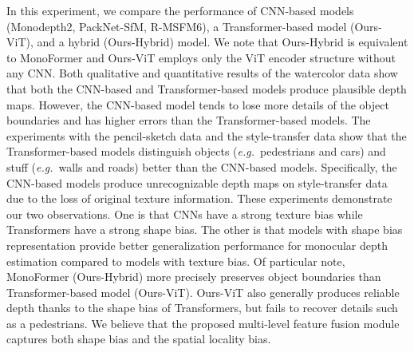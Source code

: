 \documentclass[letterpaper]{article} \usepackage{aaai23}  \usepackage{times}  \usepackage{helvet}  \usepackage{courier}  \usepackage[hyphens]{url}  \usepackage{graphicx} \urlstyle{rm} \def\UrlFont{\rm}  \usepackage{natbib}  \usepackage{caption} \frenchspacing  \setlength{\pdfpagewidth}{8.5in} \setlength{\pdfpageheight}{11in} \usepackage{algorithm}
\newcommand{\eg}{\textit{e.g.}}
\begin{document}
In this experiment, we compare the performance of CNN-based models (Monodepth2, PackNet-SfM, R-MSFM6), a Transformer-based model (Ours-ViT), and a hybrid (Ours-Hybrid) model.
We note that Ours-Hybrid is equivalent to MonoFormer and Ours-ViT employs only the ViT  \cite{dosovitskiy2020image} encoder structure without any CNN.
Both qualitative and quantitative results of the watercolor data show that both the CNN-based and Transformer-based models produce plausible depth maps. However, the CNN-based model tends to lose more details of the object boundaries and has higher errors than the Transformer-based models.
The experiments with the pencil-sketch data and the style-transfer data show that the Transformer-based models distinguish objects (\eg~pedestrians and cars) and stuff (\eg~walls and roads) better than the CNN-based models.
Specifically, the CNN-based models produce unrecognizable depth maps on style-transfer data due to the loss of original texture information.
These experiments demonstrate our two observations. 
One is that CNNs have a strong texture bias while Transformers have a strong shape bias.
The other is that models with shape bias representation provide better generalization performance for monocular depth estimation compared to models with texture bias. 
Of particular note, MonoFormer (Ours-Hybrid) more precisely preserves object boundaries than Transformer-based model (Ours-ViT). Ours-ViT also generally produces reliable depth thanks to the shape bias of Transformers, but fails to recover details such as a pedestrians. We believe that the proposed multi-level feature fusion module captures both shape bias and the spatial locality bias.
\end{document}
